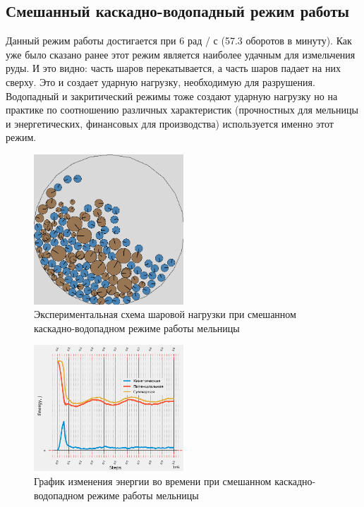 \documentclass[utf8x, 14pt, oneside, a4paper]{article}
\begin{document}
\subsection{Смешанный каскадно-водопадный режим работы}

Данный режим работы достигается при 6 рад / с (57.3 оборотов в минуту).
Как уже было сказано ранее этот режим является наиболее удачным для измельчения руды.
И это видно: часть шаров перекатывается, а часть шаров падает на них сверху.
Это и создает ударную нагрузку, необходимую для разрушения.
Водопадный и закритический режимы тоже создают ударную нагрузку но на практике по соотношению различных характеристик (прочностных для мельницы и энергетических, финансовых для производства) используется именно этот режим.

\begin{figure}[H]
	\centering
	\includegraphics[width=0.5\textwidth]{smeshan_result} 
	\caption{Экспериментальная схема шаровой нагрузки при смешанном каскадно-водопадном режиме работы мельницы}
	\label{pic:smeshan_result}
\end{figure} 

\begin{figure}[H]
	\centering
	\includegraphics[width=0.5\textwidth]{smeshan_energy} 
	\caption{График изменения энергии во времени при смешанном каскадно-водопадном режиме работы мельницы}
	\label{pic:smeshan_energy}
\end{figure} 
\end{document}
